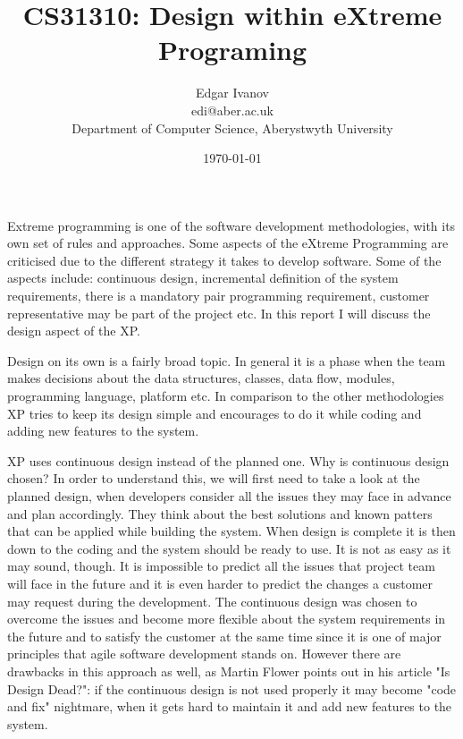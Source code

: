 \documentclass[]{report}
\begin{document}
\title{CS31310: Design within eXtreme Programing}
\author{Edgar Ivanov\\ edi@aber.ac.uk \\ Department of Computer Science, Aberystwyth University}
\date{\today}
\maketitle

Extreme programming is one of the software development methodologies, with its own set of rules and approaches. Some aspects of the eXtreme Programming are criticised due to the different strategy it takes to develop software. Some of the aspects include: continuous design, incremental definition of the system requirements, there is a mandatory pair programming requirement, customer representative may be part of the project etc. In this report I will discuss the design aspect of the XP. 

Design on its own is a fairly broad topic. In general it is a phase when the team makes decisions about the data structures, classes, data flow, modules, programming language, platform etc. In comparison to the other methodologies XP tries to keep its design simple and encourages to do it while coding and adding new features to the system.

XP uses continuous design instead of the planned one. Why is continuous design chosen? In order to understand this, we will first need to take a look at the planned design, when developers consider all the issues they may face in advance and plan accordingly. They think about the best solutions and known patters that can be applied while building the system. When design is complete it is then down to the coding and the system should be ready to use. It is not as easy as it may sound, though. It is impossible to predict all the issues that project team will face in the future and it is even harder to predict the changes a customer may request during the development. The continuous design was chosen to overcome the issues and become more flexible about the system requirements in the future and to satisfy the customer at the same time since it is one of major principles that agile software development stands on\cite{AgilePrinc}. However there are drawbacks in this approach as well, as Martin Flower points out in his article "Is Design Dead?": if the continuous design is not used properly it may become "code and fix" nightmare, when it gets hard to maintain it and add new features to the system.
\end{document}
